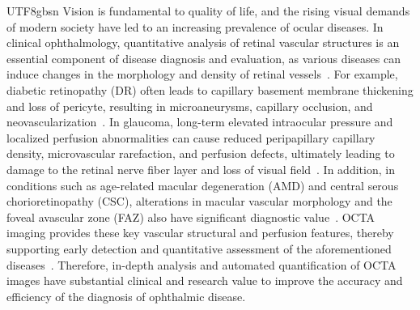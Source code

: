 \documentclass[times, review, 10pt]{elsarticle}
\begin{document}
\begin{CJK}{UTF8}{gbsn}
Vision is fundamental to quality of life, and the rising visual demands of modern society have led to an increasing prevalence of ocular diseases. In clinical ophthalmology, quantitative analysis of retinal vascular structures is an essential component of disease diagnosis and evaluation, as various diseases can induce changes in the morphology and density of retinal vessels~\cite{ref21}. For example, diabetic retinopathy (DR) often leads to capillary basement membrane thickening and loss of pericyte, resulting in microaneurysms, capillary occlusion, and neovascularization~\cite{ref23}. In glaucoma, long-term elevated intraocular pressure and localized perfusion abnormalities can cause reduced peripapillary capillary density, microvascular rarefaction, and perfusion defects, ultimately leading to damage to the retinal nerve fiber layer and loss of visual field~\cite{ref24}. In addition, in conditions such as age-related macular degeneration (AMD) and central serous chorioretinopathy (CSC), alterations in macular vascular morphology and the foveal avascular zone (FAZ) also have significant diagnostic value~\cite{ref25}. OCTA imaging provides these key vascular structural and perfusion features, thereby supporting early detection and quantitative assessment of the aforementioned diseases~\cite{ref22}. Therefore, in-depth analysis and automated quantification of OCTA images have substantial clinical and research value to improve the accuracy and efficiency of the diagnosis of ophthalmic disease.


\end{CJK}
\end{document}
